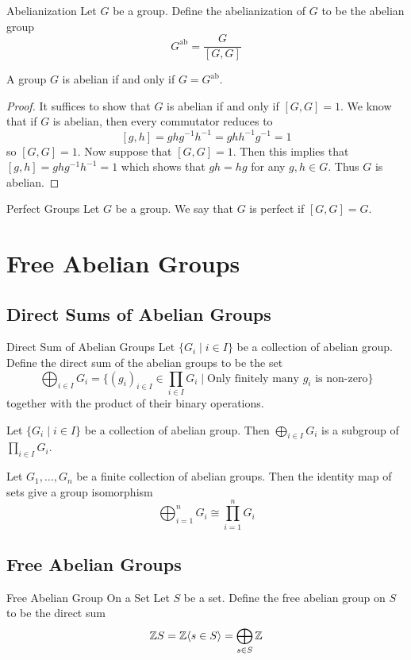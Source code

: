 \documentclass[a4paper]{article}
\begin{document}
\begin{defn}{Abelianization}{} Let $G$ be a group. Define the abelianization of $G$ to be the abelian group $$G^\text{ab}=\frac{G}{[G,G]}$$
\end{defn}

\begin{prp}{}{} A group $G$ is abelian if and only if $G=G^\text{ab}$. 
\begin{proof}
It suffices to show that $G$ is abelian if and only if $[G,G]=1$. We know that if $G$ is abelian, then every commutator reduces to $$[g,h]=ghg^{-1}h^{-1}=ghh^{-1}g^{-1}=1$$ so $[G,G]=1$. Now suppose that $[G,G]=1$. Then this implies that $[g,h]=ghg^{-1}h^{-1}=1$ which shows that $gh=hg$ for any $g,h\in G$. Thus $G$ is abelian. 
\end{proof}
\end{prp}

\begin{defn}{Perfect Groups}{} Let $G$ be a group. We say that $G$ is perfect if $[G,G]=G$. 
\end{defn}

\pagebreak
\section{Free Abelian Groups}
\subsection{Direct Sums of Abelian Groups}
\begin{defn}{Direct Sum of Abelian Groups}{} Let $\{G_i\;|\;i\in I\}$ be a collection of abelian group. Define the direct sum of the abelian groups to be the set $$\bigoplus_{i\in I}G_i=\{(g_i)_{i\in I}\in\prod_{i\in I}G_i\;|\;\text{Only finitely many }g_i\text{ is non-zero}\}$$ together with the product of their binary operations. 
\end{defn}

\begin{lmm}{}{} Let $\{G_i\;|\;i\in I\}$ be a collection of abelian group. Then $\bigoplus_{i\in I}G_i$ is a subgroup of $\prod_{i\in I}G_i$. 
\end{lmm}

\begin{lmm}{}{} Let $G_1,\dots,G_n$ be a finite collection of abelian groups. Then the identity map of sets give a group isomorphism $$\bigoplus_{i=1}^nG_i\cong\prod_{i=1}^nG_i$$
\end{lmm}

\subsection{Free Abelian Groups}
\begin{defn}{Free Abelian Group On a Set}{} Let $S$ be a set. Define the free abelian group on $S$ to be the direct sum $$\mathbb{Z} S=\mathbb{Z}\langle s\in S\rangle=\bigoplus_{s\in S}\mathbb{Z}$$ 
\end{defn}
\end{document}
